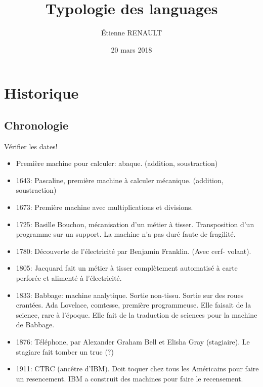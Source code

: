 \documentclass[a4paper,11pt]{article}
\title{Typologie des languages}
\author{Étienne RENAULT}
\date{20 mars 2018}
\begin{document}
\maketitle
\tableofcontents
\newpage
\section{Historique}

\subsection{Chronologie}

Vérifier les dates!

\begin{itemize}

\item Première machine pour calculer: abaque. (addition, soustraction)

\item 1643: Pascaline, première machine à calculer mécanique. (addition,
  soustraction)

\item 1673: Première machine avec multiplications et divisions.

\item 1725: Basille Bouchon, mécanisation d'un métier à tisser. Transposition
  d'un programme sur un support. La machine n'a pas duré faute de fragilité.

\item 1780: Découverte de l'électricité par Benjamin Franklin. (Avec cerf-
  volant).

\item 1805: Jacquard fait un métier à tisser complètement automatisé à carte
  perforée   et alimenté à l'électricité.

\item 1833: Babbage: machine analytique. Sortie non-tissu. Sortie sur des roues
  crantées. Ada Lovelace, comtesse, première programmeuse. Elle faisait de la
  science, rare à l'époque. Elle fait de la traduction de sciences pour la
  machine de Babbage.

\item 1876: Téléphone, par Alexander Graham Bell et Elisha Gray (stagiaire).
  Le stagiare fait tomber un truc  (?)

\item 1911: CTRC (ancêtre d'IBM). Doit toquer chez tous les Américains pour
  faire un resencement.
  IBM a construit des machines pour faire le recensement.


\end{itemize}
\end{document}

